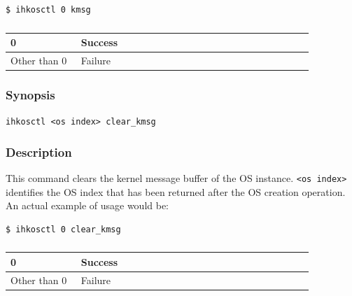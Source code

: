 \documentclass[twoside,11pt,fleqn]{book}
\begin{document}
\begin{verbatim}
$ ihkosctl 0 kmsg
\end{verbatim}

\subsubsection*{}
\begin{table}[!h]
\footnotesize
\begin{tabular}{|p{0.20\linewidth}|p{0.66\linewidth}|} \hline
0&Success\\ \hline
Other than 0&Failure\\ \hline
\end{tabular}
\vspace{-0em}
\end{table}
\FloatBarrier

\subsubsection{}
\subsubsection*{Synopsis}{\quad} \texttt{ihkosctl <os index> clear\_kmsg}
\subsubsection*{Description}{\quad}
This command clears the kernel message buffer of the OS instance.
\texttt{<os index>} identifies the OS index
that has been returned after the OS creation operation.
An actual example of usage would be:

\begin{verbatim}
$ ihkosctl 0 clear_kmsg
\end{verbatim}

\subsubsection*{}
\begin{table}[!h]
\footnotesize
\begin{tabular}{|p{0.20\linewidth}|p{0.66\linewidth}|} \hline
0&Success\\ \hline
Other than 0&Failure\\ \hline
\end{tabular}
\vspace{-0em}
\end{table}
\FloatBarrier
\end{document}
